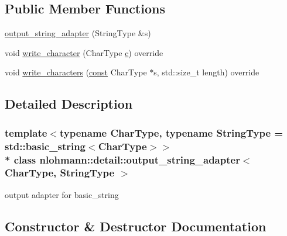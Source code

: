 \subsection*{Public Member Functions}
\begin{DoxyCompactItemize}
\item 
\hyperlink{classnlohmann_1_1detail_1_1output__string__adapter_a1e21ccc96316cb7fc1adcc58f509d581}{output\+\_\+string\+\_\+adapter} (String\+Type \&s)
\item 
void \hyperlink{classnlohmann_1_1detail_1_1output__string__adapter_a2d76cc6c88ddbc196a63fcfcac9ee7d1}{write\+\_\+character} (Char\+Type \hyperlink{functions__f_8js_aadfd49790b56c82605242ff3896447ed}{c}) override
\item 
void \hyperlink{classnlohmann_1_1detail_1_1output__string__adapter_ab5ea4da075305d225dfd84ad997e8747}{write\+\_\+characters} (\hyperlink{functions__c_8js_afacfd9c985d225bb07483b887a801b6f}{const} Char\+Type $\ast$s, std\+::size\+\_\+t length) override
\end{DoxyCompactItemize}


\subsection{Detailed Description}
\subsubsection*{template$<$typename Char\+Type, typename String\+Type = std\+::basic\+\_\+string$<$\+Char\+Type$>$$>$\\*
class nlohmann\+::detail\+::output\+\_\+string\+\_\+adapter$<$ Char\+Type, String\+Type $>$}

output adapter for basic\+\_\+string 

\subsection{Constructor \& Destructor Documentation}
